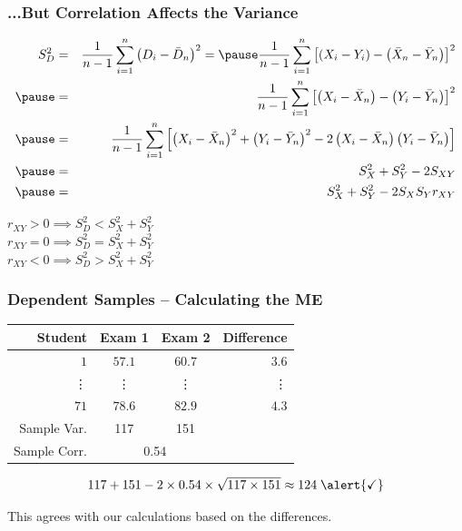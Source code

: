 \begin{frame}
\frametitle{...But Correlation Affects the Variance}
\footnotesize
\begin{eqnarray*}
	S_D^2&=& \frac{1}{n-1}\sum_{i=1}^n \left( D_i - \bar{D}_n\right)^2 = \pause \frac{1}{n-1}\sum_{i=1}^n \left[ \left( X_i - Y_i\right) - \left( \bar{X}_n - \bar{Y}_n\right)\right]^2\\ \pause
	&=&\frac{1}{n-1}\sum_{i=1}^n \left[ \left( X_i - \bar{X}_n\right) - \left( Y_i - \bar{Y}_n\right)\right]^2\\ \pause
	&=&\frac{1}{n-1}\sum_{i=1}^n \left[ \left( X_i - \bar{X}_n\right)^2 + \left( Y_i - \bar{Y}_n\right)^2 - 2\left(X_i - \bar{X}_n\right)\left(Y_i - \bar{Y}_n\right)\right]\\ \pause
	&=& S_X^2 + S_Y^2 - 2 S_{XY}\\ \pause
	&=& S_X^2 + S_Y^2 - 2 S_X S_Y r_{XY}
\end{eqnarray*}

\pause

\vspace{1em}
\alert{$\boxed{r_{XY} > 0 \implies S_D^2 < S_X^2 + S_Y^2}$} \\ \pause
\alert{$\boxed{r_{XY} = 0 \implies S_D^2 = S_X^2 + S_Y^2}$} \\ \pause
\alert{$\boxed{r_{XY} < 0 \implies S_D^2 > S_X^2 + S_Y^2}$}

\end{frame}
\begin{frame}
\frametitle{Dependent Samples -- Calculating the ME}
%
\begin{table}[!tbp]
\begin{center}
\begin{tabular}{rccr}
\hline\hline
\multicolumn{1}{r}{Student}&\multicolumn{1}{c}{Exam 1}&\multicolumn{1}{c}{Exam 2}&\multicolumn{1}{r}{Difference}\tabularnewline
\hline
$ 1$&$57.1$&$60.7$&$  3.6$\tabularnewline
\vdots&\vdots&\vdots&\vdots\\
$71$&$78.6$&$82.9$&$  4.3$\tabularnewline
\hline
Sample Var. &117  & 151 & \alert{\fbox{?}}\\
Sample Corr.& \multicolumn{2}{c}{0.54}&\\
\hline
\end{tabular}
\end{center}
\end{table}

$$117 + 151 - 2 \times 0.54 \times \sqrt{117 \times 151} \approx 124   \;\alert{\checkmark}$$

\alert{This agrees with our calculations based on the differences.}
\end{frame}
